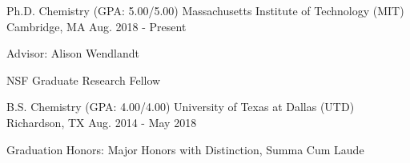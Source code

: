 

\begin{cventries}

  \cventry
    {Ph.D. Chemistry (GPA: 5.00/5.00)} %
    {Massachusetts Institute of Technology (MIT)} %
    {Cambridge, MA} %
    {Aug. 2018 - Present} %
    {
      \begin{cvitems} %
        \item[] {Advisor: Alison Wendlandt}
        \item[] {NSF Graduate Research Fellow}
      \end{cvitems}
    }
    

\cventry
    {B.S. Chemistry (GPA: 4.00/4.00)} %
    {University of Texas at Dallas (UTD)} %
    {Richardson, TX} %
    {Aug. 2014 - May 2018} %
    {
      \begin{cvitems} %
        \item[] {Graduation Honors: Major Honors with Distinction, Summa Cum Laude}
      \end{cvitems}
    }
\end{cventries}
